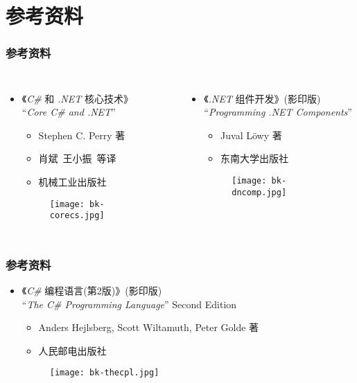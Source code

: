 \section{参考资料}
\begin{frame}[t]
\frametitle{参考资料}

\begin{columns}
  \begin{itemize}
  \item \small 《\textit{C\#} 和 \textit{.NET} 核心技术》\\
    ``\textit{Core C\# and .NET}''
    \begin{itemize}
    \item Stephen C. Perry 著
    \item 肖斌\ 王小振\ 等译
    \item 机械工业出版社
    \end{itemize}
    \begin{figure}
      \centering
\texttt{[image: bk-corecs.jpg]}
    \end{figure}
  \end{itemize}

  \begin{itemize}
  \item 《\textit{.NET} 组件开发》(影印版)\\
 ``\textit{Programming .NET Components}''
    \begin{itemize}
    \item Juval L\"owy 著
    \item 东南大学出版社
    \end{itemize}
    \begin{figure}
      \centering
\texttt{[image: bk-dncomp.jpg]}
    \end{figure}
  \end{itemize}
\end{columns}
\end{frame}

\begin{frame}[t]
\frametitle{参考资料}

\begin{itemize}
\item 《\textit{C\#} 编程语言(第2版)》(影印版)\\
  ``\textit{The C\# Programming Language}'' Second Edition
  \begin{itemize}
  \item Anders Hejlsberg, Scott Wiltamuth, Peter Golde 著
  \item 人民邮电出版社
  \end{itemize}
  \begin{figure}
    \centering
    \texttt{[image: bk-thecpl.jpg]}
  \end{figure}
\end{itemize}
\end{frame}

